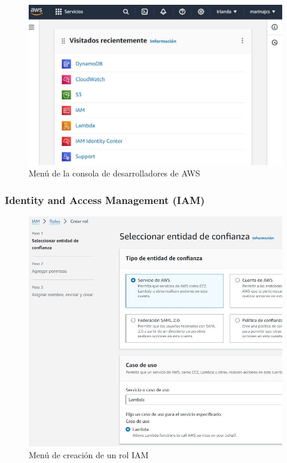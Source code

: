 \begin{figure}[H]
	\centering
	\includegraphics[width=1\textwidth]{imgs/aws-console-1.jpg}
	\caption{Menú de la consola de desarrolladores de AWS}
	\label{fig:aws-console-1}
\end{figure}


\subsubsection{Identity and Access Management (IAM)}

\begin{figure}[H]
	\centering
	\includegraphics[width=1\textwidth]{imgs/aws-iam-2.jpg}
	\caption{Menú de creación de un rol IAM}
	\label{fig:aws-iam-2}
\end{figure}

